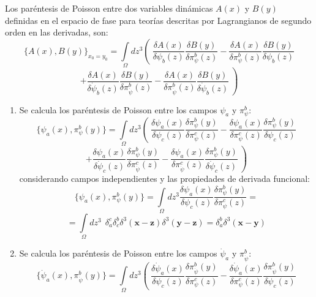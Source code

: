 \documentclass[a4paper,12pt]{article}
\begin{document}
Los paréntesis de Poisson entre dos variables dinámicas \mbox{$A(x)$} y \mbox{$B(y)$} definidas en el espacio de fase para teorías descritas por Lagrangianos de segundo orden en las derivadas, son:
\begin{equation}
\{A(x),B(y)\}_{x_0=y_0}=\int\limits_{\Omega}dz^3\left(\ \frac{\delta A(x)}{\delta\psi_b(z)}\frac{\delta B(y)}{\delta \pi^{b}_{\psi}(z) }-\frac{\delta A(x)}{\delta \pi^{b}_{\psi}(z) }\frac{\delta B(y)}{\delta\psi_b(z)}\right. 
\end{equation}
$$\left.+\frac{\delta A(x)}{\delta \dot\psi_{b}(z)}\frac{\delta B(y)}{\delta \pi^{b}_{\dot\psi}(z) }-\frac{\delta A(x)}{\delta \pi^{b}_{\dot\psi}(z) }\frac{\delta B(y)}{\delta \dot\psi_{b}(z) }\ \right)$$
\begin{enumerate}
\item[\fbox{1.}] Se calcula los paréntesis de Poisson entre los campos $\psi_a$ y $\pi^{b}_{\psi}$:
\begin{equation}
\{\psi_a(x),\pi^{b}_{\psi}(y)\}=\int\limits_{\Omega}dz^3\left(\ \frac{\delta \psi_a(x)}{\delta\psi_c(z)}\frac{\delta \pi^{b}_{\psi}(y)}{\delta \pi^{c}_{\psi}(z) }-\frac{\delta \psi_a(x)}{\delta \pi^{c}_{\psi}(z) }\frac{\delta \pi^{b}_{\psi}(y)}{\delta\psi_c(z)}\right. 
\end{equation}
$$\left.+\frac{\delta \psi_a(x)}{\delta \dot\psi_{c}(z)}\frac{\delta \pi^{b}_{\psi}(y)}{\delta \pi^{c}_{\dot\psi}(z) }-\frac{\delta \psi_a(x)}{\delta \pi^{c}_{\dot\psi}(z) }\frac{\delta \pi^{b}_{\psi}(y)}{\delta \dot\psi_{c}(z) }\ \right)$$
considerando campos independientes y las propiedades de derivada funcional:
\begin{equation}
\{\psi_a(x),\pi^{b}_{\psi}(y)\}=\int\limits_{\Omega}dz^3\frac{\delta \psi_a(x)}{\delta\psi_c(z)}\frac{\delta \pi^{b}_{\psi}(y)}{\delta \pi^{c}_{\psi}(z) }=
\end{equation}
$$=\int\limits_{\Omega}dz^3\ \ \delta_{a}^{c}\delta_{c}^{b}\delta^3(\textbf{x}-\textbf{z})\delta^3(\textbf{y}-\textbf{z})=\delta_{a}^{b}\delta^3(\textbf{x}-\textbf{y}) $$
\item[\fbox{2.}] Se calcula los paréntesis de Poisson entre los campos $\dot\psi_a$ y $\pi^{b}_{\dot\psi}$:
\begin{equation}
\{\dot\psi_a(x),\pi^{b}_{\dot\psi}(y)\}=\int\limits_{\Omega}dz^3\left(\ \frac{\delta \dot\psi_a(x)}{\delta\psi_c(z)}\frac{\delta \pi^{b}_{\dot\psi}(y)}{\delta \pi^{c}_{\psi}(z) }-\frac{\delta \dot\psi_a(x)}{\delta \pi^{c}_{\psi}(z) }\frac{\delta \pi^{b}_{\dot\psi}(y)}{\delta\psi_c(z)}\right.  
\end{equation}

\end{enumerate}
\end{document}
